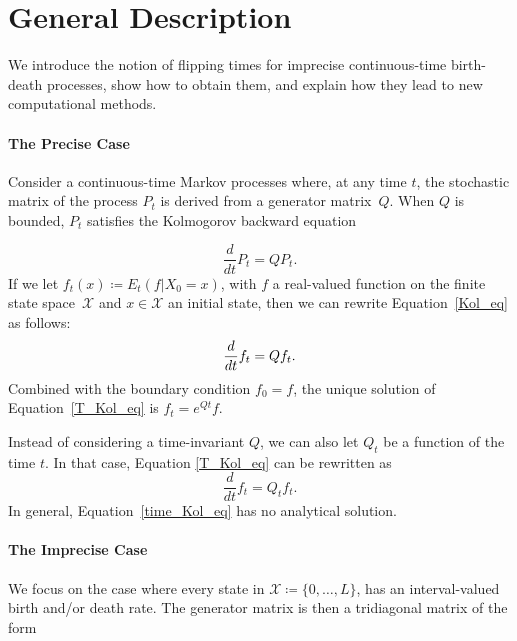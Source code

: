 \documentclass{article}
\title{}
\date{}
\author{
}
\newcommand{\nats}{\mathbb{N}}
\newcommand{\statessymbol}{\mathcal{X}}
\newcommand{\stateset}{\statessymbol}
\begin{document}
\maketitle

\section{General Description}

We introduce the notion of flipping times for imprecise continuous-time birth-death processes, show how to obtain them, and explain how they lead to new computational methods.
\paragraph{The Precise Case} 
Consider a continuous-time Markov processes where, at any time $t$, the stochastic matrix of the process $P_{t}$ is derived from a generator matrix~$Q$.
When $Q$ is bounded, $P_{t}$ satisfies the Kolmogorov backward equation

\begin{equation} \label{Kol_eq}
\frac{d}{dt}P_{t}=QP_{t}.
\end{equation}
If we let $f_{t}(x)\coloneqq E_{t}(f\vert X_0=x)$, with $f$ a real-valued function on the finite state space~$\mathcal{X}$ and $x\in\mathcal{X}$ an initial state, then
we can rewrite Equation~\eqref{Kol_eq} as follows:
\begin{equation} \label{T_Kol_eq}
\frac{d}{dt}f_{t}=Qf_{t}.
\vspace{3pt}
\end{equation}
Combined with the boundary condition $f_0=f$, the unique solution of Equation~\eqref{T_Kol_eq} is $f_{t}=e^{Qt}f$.

Instead of considering a time-invariant $Q$, we can also let $Q_{t}$ be a function of the time $t$.
 In that case, Equation \eqref{T_Kol_eq} can be rewritten as
 \begin{equation} \label{time_Kol_eq}
\frac{d}{dt}f_{t}=Q_{t}f_{t}. 
\end{equation}
In general, Equation~\eqref{time_Kol_eq} has no analytical solution.
\paragraph{The Imprecise Case}We focus on the case where every state in $\stateset\coloneqq \{0,\ldots,L\}$, %
has an interval-valued birth and/or death rate. The generator matrix is then a tridiagonal matrix of the form 
\end{document}
